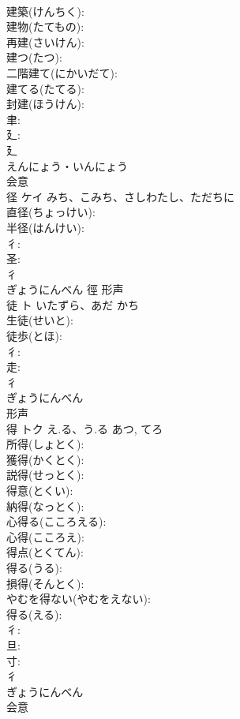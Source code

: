 \documentclass[8pt]{extreport}
\begin{document}
\begin{CJK}{UTF8}{min}
\\	建築(けんちく): 
\\	建物(たてもの): 
\\	再建(さいけん): 
\\	建つ(たつ): 
\\	二階建て(にかいだて): 
\\	建てる(たてる): 
\\	封建(ほうけん): 
\\	聿: 
\\	廴: 
\\	廴	
\\	えんにょう・いんにょう	
\\	会意 
\\	径	ケイ	みち、こみち、さしわたし、ただちに		
\\	直径(ちょっけい): 
\\	半径(はんけい): 
\\	彳: 
\\	圣: 
\\	彳	
\\	ぎょうにんべん	徑	形声 
\\	徒	ト	いたずら、あだ	かち	
\\	生徒(せいと): 
\\	徒歩(とほ): 
\\	彳: 
\\	走: 
\\	彳	
\\	ぎょうにんべん	
\\	形声 
\\	得	トク	え.る、う.る	あつ, てろ	
\\	所得(しょとく): 
\\	獲得(かくとく): 
\\	説得(せっとく): 
\\	得意(とくい): 
\\	納得(なっとく): 
\\	心得る(こころえる): 
\\	心得(こころえ): 
\\	得点(とくてん): 
\\	得る(うる): 
\\	損得(そんとく): 
\\	やむを得ない(やむをえない): 
\\	得る(える): 
\\	彳: 
\\	旦: 
\\	寸: 
\\	彳	
\\	ぎょうにんべん	
\\	会意 

\end{CJK}
\end{document}
